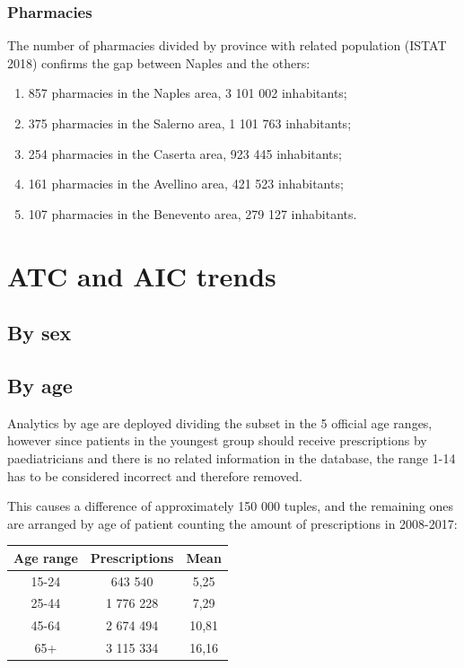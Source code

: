 \subsubsection{Pharmacies}
The number of pharmacies divided by province with related population (ISTAT 2018) confirms the gap between Naples and the others: 
\begin{enumerate}
	\item 857 pharmacies in the Naples area, 3 101 002 inhabitants;
	\item 375 pharmacies in the Salerno area, 1 101 763 inhabitants;
	\item 254 pharmacies in the Caserta area, 923 445 inhabitants;
	\item 161 pharmacies in the Avellino area, 421 523 inhabitants;
	\item 107 pharmacies in the Benevento area, 279 127 inhabitants.
\end{enumerate}

\section{ATC and AIC trends}

\subsection{By sex}

\subsection{By age}
Analytics by age are deployed dividing the subset in the 5 official age ranges, however since patients in the youngest group should receive prescriptions by paediatricians and there is no related information in the database, the range 1-14 has to be considered incorrect and therefore removed.

This causes a difference of approximately 150 000 tuples, and the remaining ones are arranged by age of patient counting the amount of prescriptions in 2008-2017:

\begin{center}
	\begin{tabular}{c|c|c}
		Age range & Prescriptions & Mean\\
		\hline
		15-24 & 643 540 & 5,25 \\
		\hline
		25-44 & 1 776 228 & 7,29 \\
		\hline
		45-64 & 2 674 494 & 10,81 \\
		\hline
		65+ & 3 115 334 & 16,16 \\
	\end{tabular}
\end{center}

